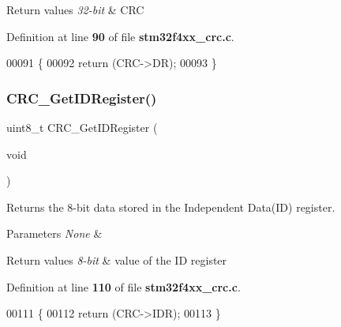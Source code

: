 \begin{DoxyRetVals}{Return values}
{\em 32-\/bit} & C\+RC \\
\hline
\end{DoxyRetVals}


Definition at line \textbf{ 90} of file \textbf{ stm32f4xx\+\_\+crc.\+c}.


\begin{DoxyCode}
00091 \{
00092   \textcolor{keywordflow}{return} (CRC->DR);
00093 \}
\end{DoxyCode}
\mbox{\label{group__CRC__Private__Functions_gaf869f6e9c3ca0ae0822cfad1abea7e5f}} 
\subsubsection{C\+R\+C\+\_\+\+Get\+I\+D\+Register()}
{\footnotesize\ttfamily uint8\+\_\+t C\+R\+C\+\_\+\+Get\+I\+D\+Register (\begin{DoxyParamCaption}\item[{void}]{ }\end{DoxyParamCaption})}



Returns the 8-\/bit data stored in the Independent Data(\+I\+D) register. 


\begin{DoxyParams}{Parameters}
{\em None} & \\
\hline
\end{DoxyParams}

\begin{DoxyRetVals}{Return values}
{\em 8-\/bit} & value of the ID register \\
\hline
\end{DoxyRetVals}


Definition at line \textbf{ 110} of file \textbf{ stm32f4xx\+\_\+crc.\+c}.


\begin{DoxyCode}
00111 \{
00112   \textcolor{keywordflow}{return} (CRC->IDR);
00113 \}
\end{DoxyCode}
\mbox{\label{group__CRC__Private__Functions_ga506467d5ef873a5a4ade4ae83cb110f6}} 
